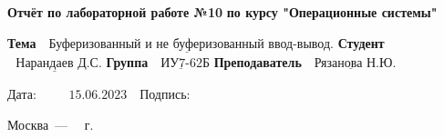 \begin{titlepage}
	\begin{center}
		\Large\textbf{Отчёт по лабораторной работе №10}
		\Large\textbf {по курсу "Операционные системы"}
	\end{center}

	\noindent\textbf{\newline Тема} $\underline{\text{~~Буферизованный и не буферизованный ввод-вывод.}}$\newline\newline
	\noindent\textbf{Студент} $\underline{\text{~~Нарандаев Д.С.}}$\newline\newline
	\noindent\textbf{Группа} $\underline{\text{~~ИУ7-62Б}}$\newline\newline
	\noindent\textbf{Преподаватель} $\underline{\text{~~Рязанова Н.Ю.}}$\newline

	\begin{text}
		\newline\newline\newline
		\null\hfill Дата:$~~~~~~$\newline
		\null\hfill \underline{$~~~~15.06.2023~~~$}\newline
		\newline
		\null\hfill Подпись:$~~~~$\newline
		\null\hfill \underline{$~~~~~~~~~~~~~~~~~~~~~$}\newline
	\end{text}
	
	\begin{center}
		\vfill
		Москва~---~\the\year
		~г.
	\end{center}
	\restoregeometry
\end{titlepage}